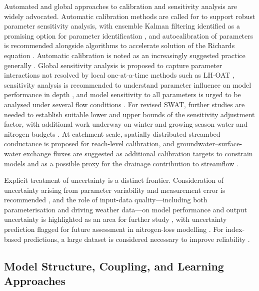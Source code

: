 \documentclass[11pt]{article}
\begin{document}
Automated and global approaches to calibration and sensitivity analysis are widely advocated. Automatic calibration methods are called for to support robust parameter sensitivity analysis, with ensemble Kalman filtering identified as a promising option for parameter identification \parencite{Warsta2014}, and autocalibration of parameters is recommended alongside algorithms to accelerate solution of the Richards equation \parencite{Sadhukhan2019b}. Automatic calibration is noted as an increasingly suggested practice generally \parencite{Singh2019b}. Global sensitivity analysis is proposed to capture parameter interactions not resolved by local one-at-a-time methods such as LH-OAT \parencite{Timalsina2023}, sensitivity analysis is recommended to understand parameter influence on model performance in depth \parencite{Chelil2022}, and model sensitivity to all parameters is urged to be analysed under several flow conditions \parencite{Kacimov2000}. For revised SWAT, further studies are needed to establish suitable lower and upper bounds of the sensitivity adjustment factor, with additional work underway on winter and growing-season water and nitrogen budgets \parencite{Moriasi2013b}. At catchment scale, spatially distributed streambed conductance is proposed for reach-level calibration, and groundwater--surface-water exchange fluxes are suggested as additional calibration targets to constrain models and as a possible proxy for the drainage contribution to streamflow \parencite{Karan2021}.

Explicit treatment of uncertainty is a distinct frontier. Consideration of uncertainty arising from parameter variability and measurement error is recommended \parencite{Alzraiee2013b}, and the role of input-data quality---including both parameterisation and driving weather data---on model performance and output uncertainty is highlighted as an area for further study \parencite{Upadhyay2019}, with uncertainty prediction flagged for future assessment in nitrogen-loss modelling \parencite{Tao2021}. For index-based predictions, a large dataset is considered necessary to improve reliability \parencite{Beauchemin2003}.

\subsection{Model Structure, Coupling, and Learning Approaches}
\end{document}

